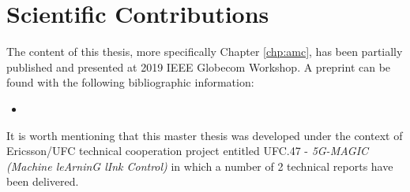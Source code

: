 \section{Scientific Contributions}
\begin{refsection}

The content of this thesis, more specifically Chapter \ref{chp:amc}, has been partially published and presented at 2019 IEEE Globecom Workshop.
%
A preprint can be found with the following bibliographic information:
%
\begin{itemize}
	\item {}
\end{itemize}

It is worth mentioning that this master thesis was developed under the context of Ericsson/UFC technical cooperation project entitled UFC.47 - \textit{5G-MAGIC (Machine leArninG lInk Control)} in which a number of 2 technical reports have been delivered.
%

\end{refsection}
